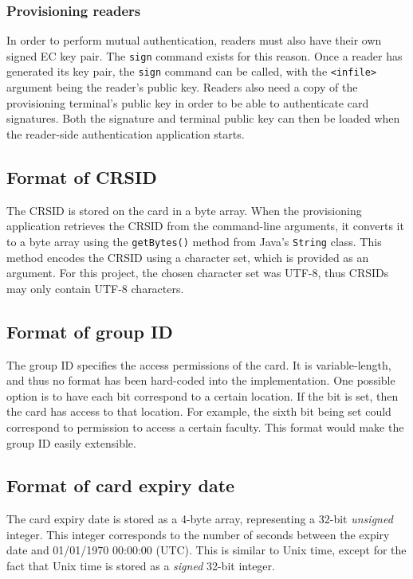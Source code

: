\documentclass[12pt,a4paper,twoside,openright]{report}
\begin{document}
\subsubsection{Provisioning readers}

In order to perform mutual authentication, readers must also have their own signed EC key pair. The \texttt{sign} command exists for this reason. Once a reader has generated its key pair, the \texttt{sign} command can be called, with the \texttt{<infile>} argument being the reader's public key. Readers also need a copy of the provisioning terminal's public key in order to be able to authenticate card signatures. Both the signature and terminal public key can then be loaded when the reader-side authentication application starts.

\subsection{Format of CRSID}

The CRSID is stored on the card in a byte array. When the provisioning application retrieves the CRSID from the command-line arguments, it converts it to a byte array using the \texttt{getBytes()} method from Java's \texttt{String} class. This method encodes the CRSID using a character set, which is provided as an argument. For this project, the chosen character set was UTF-8, thus CRSIDs may only contain UTF-8 characters.

\subsection{Format of group ID}

The group ID specifies the access permissions of the card. It is variable-length, and thus no format has been hard-coded into the implementation. One possible option is to have each bit correspond to a certain location. If the bit is set, then the card has access to that location. For example, the sixth bit being set could correspond to permission to access a certain faculty. This format would make the group ID easily extensible.

\subsection{Format of card expiry date}

The card expiry date is stored as a 4-byte array, representing a 32-bit \emph{unsigned} integer. This integer corresponds to the number of seconds between the expiry date and 01/01/1970 00:00:00 (UTC). This is similar to Unix time, except for the fact that Unix time is stored as a \emph{signed} 32-bit integer.
\end{document}
